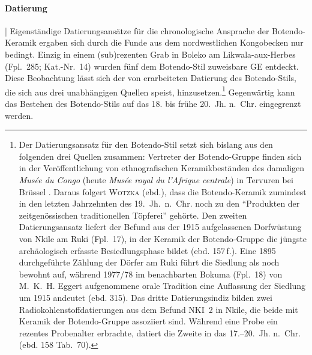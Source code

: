 \paragraph{Datierung}\hspace{-.5em}|\hspace{.5em}%
Eigenständige Datierungsansätze für die chronologische Ansprache der Botendo-Keramik ergaben sich durch die Funde aus dem nordwestlichen Kongobecken nur bedingt. Einzig in einem (sub)rezenten Grab in Boleko am Likwala-aux-Herbes (Fpl.~285; Kat.-Nr.~14) wurden fünf dem Botendo-Stil zuweisbare GE entdeckt. Diese Beobachtung lässt sich der von \textcite[156--158]{Wotzka.1995} erarbeiteten Datierung des Botendo-Stils, die sich aus drei unabhängigen Quellen speist, hinzusetzen.\footnote{Der Datierungsansatz für den Botendo-Stil setzt sich bislang aus den folgenden drei Quellen zusammen: Vertreter der Botendo-Gruppe finden sich in der Veröffentlichung von ethnografischen Keramikbeständen des damaligen \textit{Musée du Congo} (heute \textit{Musée royal du l'Afrique centrale}) in Tervuren bei Brüssel \parencites[155--157 Taf.~12]{Coart.1907}[157]{Wotzka.1995}. Daraus folgert \textsc{Wotzka} (ebd.), dass die Botendo-Keramik zumindest in den letzten Jahrzehnten des 19.~Jh.~n.~Chr. noch zu den \enquote{Produkten der zeitgenössischen traditionellen Töpferei} gehörte. Den zweiten Datierungsansatz liefert der Befund aus der 1915 aufgelassenen Dorfwüstung von Nkile am Ruki (Fpl.~17), in der Keramik der Botendo-Gruppe die jüngste archäologisch erfasste Besiedlungsphase bildet (ebd. 157\,f.). Eine 1895 durchgeführte Zählung der Dörfer am Ruki führt die Siedlung als noch bewohnt auf, während 1977/78 im benachbarten Bokuma (Fpl.~18) von M.~K.~H. Eggert aufgenommene orale Tradition eine Auflassung der Siedlung um 1915 andeutet (ebd. 315). Das dritte Datierungsindiz bilden zwei Radiokohlenstoffdatierungen aus dem Befund NKI~2 in Nkile, die beide mit Keramik der Botendo-Gruppe assoziiert sind. Während eine Probe ein rezentes Probenalter erbrachte, datiert die Zweite in das 17.--20.~Jh. n.~Chr. (ebd. 158 Tab.~70).} Gegenwärtig kann das Bestehen des Botendo-Stils auf das 18. bis frühe 20.~Jh. n.~Chr. eingegrenzt werden.

